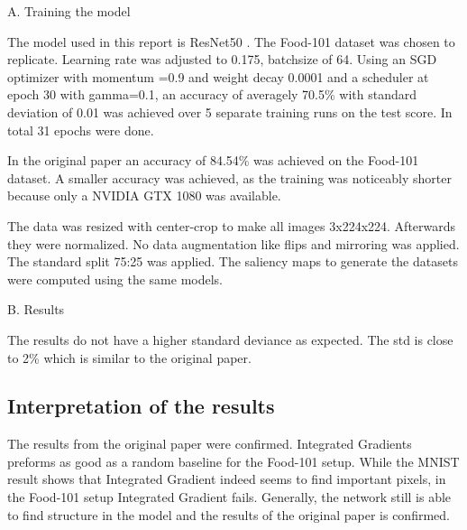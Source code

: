 A. Training the model

The model used in this report is ResNet50 \cite{he2015deep}. The Food-101 \cite{bossard14} dataset was chosen to replicate. Learning rate was adjusted to 0.175, batchsize of 64. Using an SGD optimizer with momentum =0.9 and weight decay 0.0001 and a scheduler at epoch 30 with gamma=0.1, an accuracy of averagely 70.5\% with standard deviation of 0.01  was achieved over 5 separate training runs on the test score. In total 31 epochs were done. 

In the original paper an accuracy of 84.54\% was achieved on the Food-101 dataset.  A smaller accuracy was achieved, as the training was noticeably shorter because only a NVIDIA GTX 1080 was available.

The data was resized with center-crop to make all images 3x224x224. Afterwards they were normalized. No data augmentation like flips and mirroring was applied. The standard split 75:25 was applied. The saliency maps to generate the datasets were computed using the same models.

B. Results




The results do not have a higher standard deviance as expected. The std is close to 2\% which is similar to the original paper.


\subsection{Interpretation of the results}

The results from the original paper were confirmed. Integrated Gradients preforms as good as a random baseline for the Food-101 setup. While the MNIST result shows that Integrated Gradient indeed seems to find important pixels, in the Food-101 setup Integrated Gradient fails. Generally, the network still is able to find structure in the model and the results of the original paper is confirmed.







